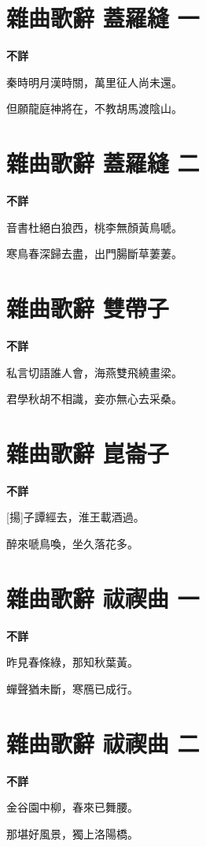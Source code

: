 \documentclass[12pt,a4paper]{ctexbook}
\begin{document}
\section{雜曲歌辭 蓋羅縫 一}
\textbf{不詳}\par\vspace{0.5em}
秦時明月漢時關，萬里征人尚未還。\par
但願龍庭神將在，不教胡馬渡陰山。\par

\section{雜曲歌辭 蓋羅縫 二}
\textbf{不詳}\par\vspace{0.5em}
音書杜絕白狼西，桃李無顏黃鳥嗁。\par
寒鳥春深歸去盡，出門腸斷草萋萋。\par

\section{雜曲歌辭 雙帶子}
\textbf{不詳}\par\vspace{0.5em}
私言切語誰人會，海燕雙飛繞畫梁。\par
君學秋胡不相識，妾亦無心去采桑。\par

\section{雜曲歌辭 崑崙子}
\textbf{不詳}\par\vspace{0.5em}
[揚]子譚經去，淮王載酒過。\par
醉來嗁鳥喚，坐久落花多。\par

\section{雜曲歌辭 祓禊曲 一}
\textbf{不詳}\par\vspace{0.5em}
昨見春條綠，那知秋葉黃。\par
蟬聲猶未斷，寒鴈已成行。\par

\section{雜曲歌辭 祓禊曲 二}
\textbf{不詳}\par\vspace{0.5em}
金谷園中柳，春來已舞腰。\par
那堪好風景，獨上洛陽橋。\par
\end{document}
